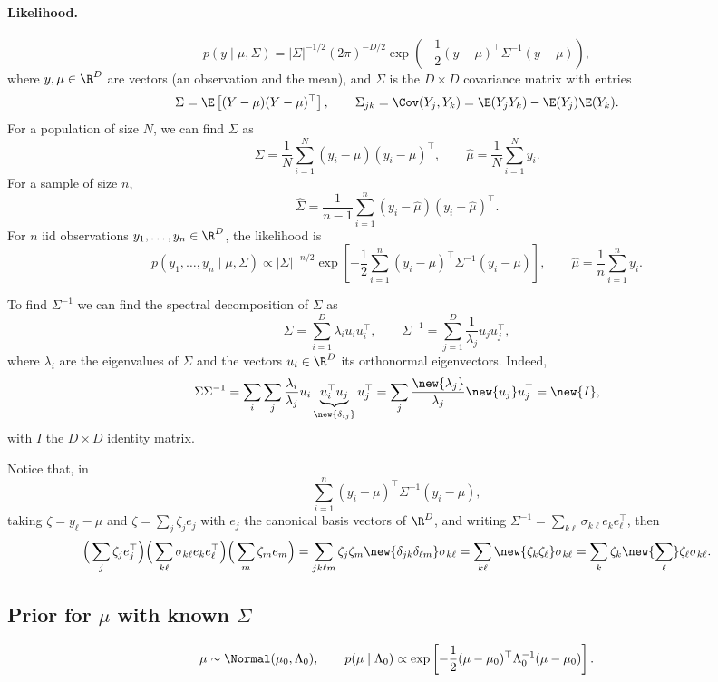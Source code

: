 \paragraph{Likelihood.}
\[
p(y \mid \mu, \Sigma) = |\Sigma|^{-1/2}(2\pi)^{-D/2}\exp\left(-\frac12(y - \mu)^{\top}\Sigma^{-1}(y - \mu)\right),
\]
where $y, \mu \in \R^D$ are vectors (an observation and the mean), and $\Sigma$ is the $D\times D$ covariance matrix with entries
\[
\Sigma = \E\left[(Y - \mu)(Y - \mu)^{\top}\right],
\qquad
\Sigma_{jk} = \Cov(Y_j, Y_k) = \E(Y_jY_k) - \E(Y_j)\E(Y_k).
\]
For a population of size $N$, we can find $\Sigma$ as
\[
\Sigma = \frac1N\sum_{i=1}^{N}(y_i - \mu)(y_i - \mu)^{\top},
\qquad
\hat\mu = \frac1N\sum_{i=1}^{N}y_i.
\]
For a sample of size $n$,
\[
\hat\Sigma = \frac{1}{n-1}\sum_{i=1}^{n}(y_i - \hat\mu)(y_i - \hat\mu)^{\top}.
\]
For $n$ iid observations $y_1, \dots, y_n \in \R^D$, the likelihood is
\[
p(y_1, \dots, y_n \mid \mu, \Sigma) \propto |\Sigma|^{-n/2}\exp\left[-\frac12\sum_{i=1}^{n}(y_i - \mu)^{\top}\Sigma^{-1}(y_i - \mu)\right],
\qquad
\hat\mu = \frac1n\sum_{i=1}^{n}y_i.
\]

To find $\Sigma^{-1}$ we can find the spectral decomposition of $\Sigma$ as
\[
\Sigma = \sum_{i=1}^{D}\lambda_i u_i u_i^{\top},
\qquad
\Sigma^{-1} = \sum_{j=1}^{D}\frac{1}{\lambda_j}u_j u_j^{\top},
\]
where $\lambda_i$ are the eigenvalues of $\Sigma$ and the vectors $u_i \in \R^D$ its orthonormal eigenvectors.
Indeed,
\[
\Sigma\Sigma^{-1} = \sum_i\sum_j\frac{\lambda_i}{\lambda_j}u_i\underbrace{u_i^{\top}u_j}_{\new{\delta_{ij}}}u_j^{\top}
= \sum_j\frac{\new{\lambda_j}}{\lambda_j}\new{u_j}u_j^{\top} = \new{I},
\]
with $I$ the $D\times D$ identity matrix.

Notice that, in
\[
\sum_{i=1}^{n}(y_i - \mu)^{\top}\Sigma^{-1}(y_i - \mu),
\]
taking $\zeta = y_\ell - \mu$ and $\zeta = \sum_j\zeta_j e_j$ with $e_j$ the canonical basis vectors of $\R^D$, and writing $\Sigma^{-1} = \sum_{k\ell}\sigma_{k\ell}e_k e_\ell^{\top}$, then
\[
\Big(\sum_j\zeta_j e_j^{\top}\Big)\Big(\sum_{k\ell}\sigma_{k\ell}e_k e_\ell^{\top}\Big)\Big(\sum_m\zeta_m e_m\Big)
= \sum_{jk\ell m}\zeta_j\zeta_m\new{\delta_{jk}\delta_{\ell m}}\sigma_{k\ell}
= \sum_{k\ell}\new{\zeta_k\zeta_\ell}\sigma_{k\ell}
= \sum_k\zeta_k\new{\sum_\ell}\zeta_\ell\sigma_{k\ell}.
\]

\subsection{Prior for $\mu$ with known $\Sigma$}
\[
\mu \sim \Normal(\mu_0, \Lambda_0),
\qquad
p(\mu \mid \Lambda_0) \propto \exp\left[-\frac12(\mu - \mu_0)^{\top}\Lambda_0^{-1}(\mu - \mu_0)\right].
\]


